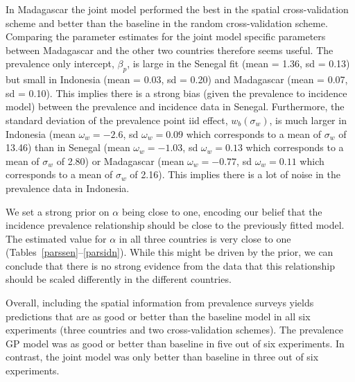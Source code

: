 \documentclass{statsoc}
\begin{document}
In Madagascar the joint model performed the best in the spatial cross-validation scheme and better than the baseline in the random cross-validation scheme. 
Comparing the parameter estimates for the joint model specific parameters between Madagascar and the other two countries therefore seems useful.
The prevalence only intercept, $\beta_p$, is large in the Senegal fit (mean = 1.36, sd = 0.13) but small in Indonesia (mean = 0.03, sd = 0.20) and Madagascar (mean = 0.07, sd = 0.10).
This implies there is a strong bias (given the prevalence to incidence model) between the prevalence and incidence data in Senegal.
Furthermore, the standard deviation of the prevalence point iid effect, $w_b(\sigma_w)$, is much larger in Indonesia (mean $\omega_w = -2.6$, sd $\omega_w = 0.09$ which corresponds to a mean of $\sigma_w$ of 13.46) than in Senegal (mean $\omega_w = -1.03$, sd $\omega_w = 0.13$ which corresponds to a mean of $\sigma_w$ of 2.80) or Madagascar (mean $\omega_w = -0.77$, sd $\omega_w = 0.11$ which corresponds to a mean of $\sigma_w$ of 2.16).
This implies there is a lot of noise in the prevalence data in Indonesia.

We set a strong prior on $\alpha$ being close to one, encoding our belief that the incidence prevalence relationship should be close to the previously fitted model.
The estimated value for $\alpha$ in all three countries is very close to one (Tables~\ref{parssen}--\ref{parsidn}).
While this might be driven by the prior, we can conclude that there is no strong evidence from the data that this relationship should be scaled differently in the different countries.


Overall, including the spatial information from prevalence surveys yields predictions that are as good or better than the baseline model in all six experiments (three countries and two cross-validation schemes).
The prevalence GP model was as good or better than baseline in five out of six experiments.
In contrast, the joint model was only better than baseline in three out of six experiments.



\end{document}
